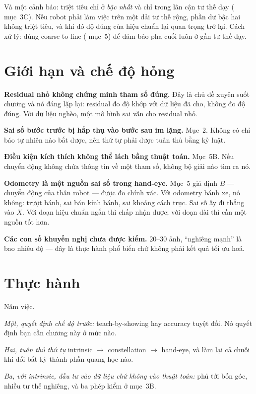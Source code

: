 \documentclass[../../marker.tex]{subfiles}
\begin{document}
Và một cảnh báo: triệt tiêu chỉ ở \emph{bậc nhất} và chỉ trong lân cận tư thế dạy ( mục~3C). Nếu robot phải làm việc trên một dải tư thế rộng, phần dư bậc hai không triệt tiêu, và khi đó độ đúng của hiệu chuẩn lại quan trọng trở lại. Cách xử lý: dùng coarse-to-fine ( mục~5) để đảm bảo pha cuối luôn ở gần tư thế dạy.

\section{Giới hạn và chế độ hỏng}

\textbf{Residual nhỏ không chứng minh tham số đúng.} Đây là chủ đề xuyên suốt chương và nó đáng lặp lại: residual đo độ khớp với dữ liệu đã cho, không đo độ đúng. Với dữ liệu nghèo, một mô hình sai vẫn cho residual nhỏ.

\textbf{Sai số bước trước bị hấp thụ vào bước sau im lặng.} Mục~2. Không có chỉ báo tự nhiên nào bắt được, nên thứ tự phải được tuân thủ bằng kỷ luật.

\textbf{Điều kiện kích thích không thể lách bằng thuật toán.} Mục~5B. Nếu chuyển động không chứa thông tin về một tham số, không bộ giải nào tìm ra nó.

\textbf{Odometry là một nguồn sai số trong hand-eye.} Mục~5 giả định \(B\) --- chuyển động của thân robot --- được đo chính xác. Với odometry bánh xe, nó không: trượt bánh, sai bán kính bánh, sai khoảng cách trục. Sai số ấy đi thẳng vào \(X\). Với đoạn hiệu chuẩn ngắn thì chấp nhận được; với đoạn dài thì cần một nguồn tốt hơn.

\textbf{Các con số khuyến nghị chưa được kiểm.} 20--30 ảnh, ``nghiêng mạnh'' là bao nhiêu độ --- đây là thực hành phổ biến chứ không phải kết quả tối ưu hoá.

\section{Thực hành}

Năm việc.

\emph{Một, quyết định chế độ trước:} teach-by-showing hay accuracy tuyệt đối. Nó quyết định bạn cần chương này ở mức nào.

\emph{Hai, tuân thủ thứ tự} intrinsic \(\rightarrow\) constellation \(\rightarrow\) hand-eye, và làm lại cả chuỗi khi đổi bất kỳ thành phần quang học nào.

\emph{Ba, với intrinsic, đầu tư vào dữ liệu chứ không vào thuật toán:} phủ tới bốn góc, nhiều tư thế nghiêng, và ba phép kiểm ở mục~3B.
\end{document}
